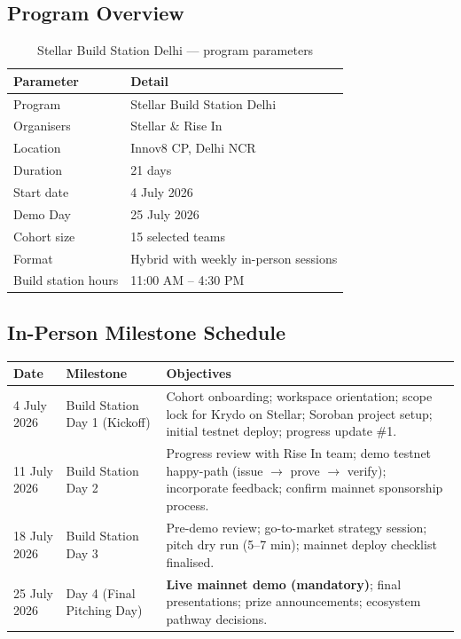 \documentclass[11pt,a4paper]{article}
\newcommand{\krydo}{\textsf{Krydo}}
\newcommand{\stellar}{\textsf{Stellar}}
\begin{document}
\subsection{Program Overview}

\begin{table}[H]
  \centering
  \caption{Stellar Build Station Delhi --- program parameters}
  \renewcommand{\arraystretch}{1.2}
  \begin{tabular}{@{}ll@{}}
    \toprule
    \textbf{Parameter} & \textbf{Detail} \\
    \midrule
    Program & Stellar Build Station Delhi \\
    Organisers & Stellar \& Rise In \\
    Location & Innov8 CP, Delhi NCR \\
    Duration & 21 days \\
    Start date & 4 July 2026 \\
    Demo Day & 25 July 2026 \\
    Cohort size & 15 selected teams \\
    Format & Hybrid with weekly in-person sessions \\
    Build station hours & 11:00 AM -- 4:30 PM \\
    \bottomrule
  \end{tabular}
\end{table}

\subsection{In-Person Milestone Schedule}

\begin{longtable}{@{}p{2.8cm} p{3.2cm} X@{}}
  \toprule
  \textbf{Date} & \textbf{Milestone} & \textbf{Objectives} \\
  \midrule
  \endhead
  4 July 2026 & Build Station Day 1 (Kickoff) &
  Cohort onboarding; workspace orientation; scope lock for \krydo{} on \stellar{};
  Soroban project setup; initial testnet deploy; progress update \#1. \\[4pt]

  11 July 2026 & Build Station Day 2 &
  Progress review with Rise In team; demo testnet happy-path (issue $\rightarrow$ prove $\rightarrow$ verify);
  incorporate feedback; confirm mainnet sponsorship process. \\[4pt]

  18 July 2026 & Build Station Day 3 &
  Pre-demo review; go-to-market strategy session; pitch dry run (5--7 min);
  mainnet deploy checklist finalised. \\[4pt]

  25 July 2026 & Day 4 (Final Pitching Day) &
  \textbf{Live mainnet demo (mandatory)}; final presentations; prize announcements;
  ecosystem pathway decisions. \\
  \bottomrule
\end{longtable}
\end{document}

